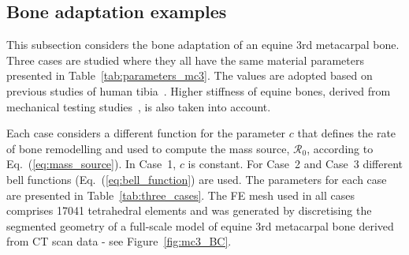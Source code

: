 \documentclass[11pt]{acmeArticle}
\numberwithin{equation}{section}
\begin{document}
\subsection{Bone adaptation examples}
\label{sec:numerical_examples:bone_adap}
This subsection considers the bone adaptation of an equine 3rd metacarpal bone.
Three cases are studied where they all have the same material parameters presented in Table~\ref{tab:parameters_mc3}.
The values are adopted based on previous studies of human tibia~\citep{Pang2012,Waffenschmidt2012}. 
Higher stiffness of equine bones, derived from mechanical testing studies~\citep{Les1994}, is also taken into account.

Each case considers a different function for the parameter $c$ that defines the rate of bone remodelling and used to compute the mass source, $\mathcal{R}_0$, according to Eq.~(\ref{eq:mass_source}).
In Case~1, $c$ is constant. For Case~2 and Case~3 different bell functions (Eq.~(\ref{eq:bell_function}) are used. The parameters for each case are presented in Table~\ref{tab:three_cases}. 
The FE mesh used in all cases comprises 17041 tetrahedral elements and was generated by discretising the segmented geometry of a full-scale model of equine 3rd metacarpal bone derived from CT scan data - see Figure~\ref{fig:mc3_BC}.
\end{document}
